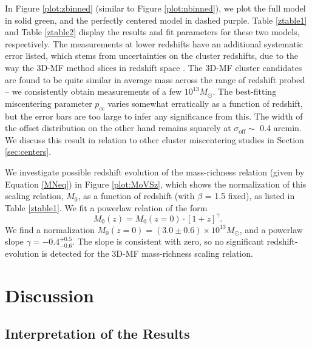 In Figure \ref{plot:zbinned} (similar to Figure \ref{plot:nbinned}), we plot the full model in solid green, and the perfectly centered model in dashed purple. Table \ref{ztable1} and Table \ref{ztable2} display the results and fit parameters for these two models, respectively. The measurements at lower redshifts have an additional systematic error listed, which stems from uncertainties on the cluster redshifts, due to the way the \ac{3D-MF} method slices in redshift space \citep{Ford14}. The \ac{3D-MF} cluster candidates are found to be quite similar in average mass across the range of redshift probed -- we consistently obtain measurements of a few $10^{13} M_{\odot}$. The best-fitting miscentering parameter $p_{\mathrm{cc}}$ varies somewhat erratically as a function of redshift, but the error bars are too large to infer any significance from this. The width of the offset distribution on the other hand remains squarely at $\sigma_{\mathrm{off}} \sim$ 0.4 arcmin. We discuss this result in relation to other cluster miscentering studies in Section \ref{sec:centers}.

We investigate possible redshift evolution of the mass-richness relation (given by Equation \ref{MNeq}) in Figure \ref{plot:MoVSz}, which shows the normalization of this scaling relation, $M_0$, as a function of redshift (with $\beta$ = 1.5 fixed), as listed in Table \ref{ztable1}. We fit a powerlaw relation of the form
\begin{equation}
\label{MoZeq}
M_0 (z) = M_0 (z=0) \cdot \left[ 1+z \right] ^{\gamma}.
\end{equation}
We find a normalization $M_0 (z=0) = (3.0 \pm 0.6) \times 10^{13} M_{\odot}$, and a powerlaw slope $\gamma = -0.4^{+0.5}_{-0.6}$. The slope is consistent with zero, so no significant redshift-evolution is detected for the \ac{3D-MF} mass-richness scaling relation.



\section{Discussion}
\label{ch4:disc}


\subsection{Interpretation of the Results}

